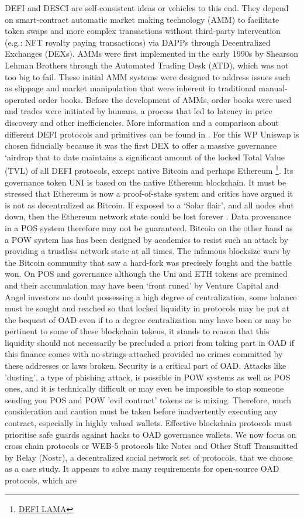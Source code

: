 \documentclass[final,5p,times,twocolumn,authoryear]{elsarticle}
\begin{document}
DEFI and DESCI are self-consistent ideas or vehicles to this end. They depend on smart-contract automatic market making technology (AMM) to facilitate token swaps and more complex transactions without third-party intervention (e.g.: NFT royalty paying transactions) via DAPPs through Decentralized Exchanges (DEXs). AMMs were first implemented in the early 1990s by Shearson Lehman Brothers through the Automated Trading Desk (ATD), which was not too big to fail. These initial AMM systems were designed to address issues such as slippage and market manipulation that were inherent in traditional manual-operated order books. Before the development of AMMs, order books were used and trades were initiated by humans, a process that led to latency in price discovery and other inefficiencies. More information and a comparison about different DEFI protocols and primitives can be found in \cite{2023arXiv230805282J}. For this WP Uniswap is chosen fiducially because it was the first DEX to offer a massive governance `airdrop that to date maintains a significant amount of the locked Total Value (TVL) of all DEFI protocols, except native Bitcoin and perhaps Ethereum \footnote{\href{https://defillama.com/protocols/dexes}{DEFI LAMA}}. Its governance token UNI is based on the native Ethereum blockchain. It must be stressed that Ethereum is now a proof-of-stake system and critics have argued it is not as decentralized as Bitcoin. If exposed to a `Solar flair', and all nodes shut down, then the Ethereum network state could be lost forever \cite{Alden2023}.  Data provenance in a POS system therefore may not be guaranteed. Bitcoin on the other hand as a POW system has has been designed by academics to resist such an attack by providing a trustless network state at all times. The infamous blocksize wars by the Bitcoin community that saw a hard-fork was precisely fought and the battle won. On POS and governance although the Uni and ETH tokens are premined and their accumulation may have been `front runed' by Venture Capital and Angel investors no doubt possessing a high degree of centralization, some balance must be sought and reached so that locked liquidity in protocols may be put at the bequest of OAD even if to a degree centralization may have been or may be pertinent to some of these blockchain tokens, it stands to reason that this liquidity should not necessarily be precluded a priori from taking part in OAD if this finance comes with no-strings-attached provided no crimes committed by these addresses or laws broken. Security is a critical part of OAD. Attacks like 'dusting', a type of phishing attack, is possible in POW systems as well as POS ones, and it is technically difficult or may even be impossible to stop someone sending you POS and POW 'evil contract' tokens as is mixing. Therefore, much consideration and caution must be taken before inadvertently executing any contract, especially in highly valued wallets. Effective blockchain protocols must prioritise safe guards against hacks to OAD governance wallets. We now focus on cross chain protocols or WEB-5 protocols like Notes and Other Stuff Transmitted by Relay (Nostr), a decentralized social network set of protocols, that we choose as a case study.  It appears to solve many requirements for open-source OAD protocols, which are 
\end{document}
